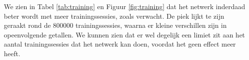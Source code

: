 We zien in Tabel \ref{tab:training} en Figuur \ref{fig:training} dat het netwerk inderdaad beter wordt met meer trainingssessies, zoals verwacht. De piek lijkt te zijn geraakt rond de 800000 trainingssessies, waarna er kleine verschillen zijn in opeenvolgende getallen. We kunnen zien dat er wel degelijk een limiet zit aan het aantal trainingssessies dat het netwerk kan doen, voordat het geen effect meer heeft.
